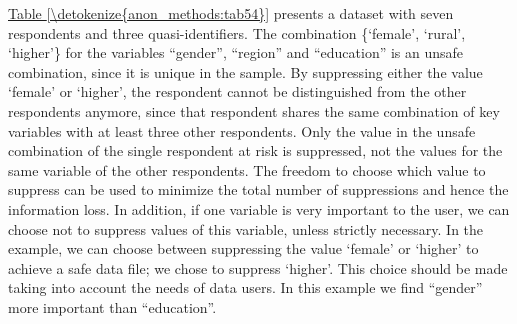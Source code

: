 \documentclass[letterpaper,10pt,english]{sphinxmanual}
\begin{document}
\hyperref[\detokenize{anon_methods:tab54}]{Table \ref{\detokenize{anon_methods:tab54}}} presents a dataset with seven respondents and three
quasi-identifiers. The combination \{‘female’, ‘rural’, ‘higher’\} for the
variables “gender”, “region” and “education” is an unsafe combination,
since it is unique in the sample. By suppressing either the value
‘female’ or ‘higher’, the respondent cannot be distinguished from the
other respondents anymore, since that respondent shares the same
combination of key variables with at least three other respondents. Only
the value in the unsafe combination of the single respondent at risk is
suppressed, not the values for the same variable of the other
respondents. The freedom to choose which value to suppress can be used
to minimize the total number of suppressions and hence the information
loss. In addition, if one variable is very important to the user, we can
choose not to suppress values of this variable, unless strictly
necessary. In the example, we can choose between suppressing the value
‘female’ or ‘higher’ to achieve a safe data file; we chose to suppress
‘higher’. This choice should be made taking into account the needs of
data users. In this example we find “gender” more important than
“education”.
\end{document}
